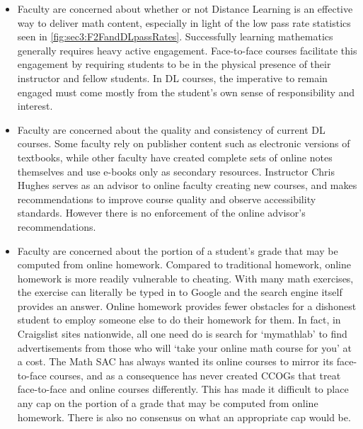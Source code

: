 \begin{itemize}
	\item Faculty are concerned about whether or not Distance Learning is an
	      effective way to deliver math content, especially in light of the low pass
	      rate statistics seen in \cref{fig:sec3:F2FandDLpassRates}.
	      Successfully learning mathematics generally requires heavy active engagement.
	      Face-to-face courses facilitate this engagement by requiring students to be in the physical presence of their instructor and fellow students.
	      In DL courses, the imperative to remain engaged must come mostly from the student's own sense of responsibility and interest.
	\item Faculty are concerned about the quality and consistency of current DL
	      courses.
	      Some faculty rely on publisher content such as electronic versions of textbooks, while other faculty have created complete sets of online notes themselves and use e-books only as secondary resources.
	      Instructor Chris Hughes serves as an advisor to online faculty creating new courses, and makes recommendations to improve course quality and observe accessibility standards.
	      However there is no enforcement of the online advisor's recommendations.
	\item Faculty are concerned about the portion of a student's grade that may be
	      computed from online homework.
	      Compared to traditional homework, online homework is more readily vulnerable to cheating.
	      With many math exercises, the exercise can literally be typed in to Google and the search engine itself provides an answer.
	      Online homework provides fewer obstacles for a dishonest student to employ someone else to do their homework for them.
	      In fact, in Craigslist sites nationwide, all one need do is search for `mymathlab' to find advertisements from those who will `take your online math course for you' at a cost.
	      The Math SAC has always wanted its online courses to mirror its face-to-face courses, and as a consequence has never created CCOGs that treat face-to-face and online courses differently.
	      This has made it difficult to place any cap on the portion of a grade that may be computed from online homework.
	      There is also no consensus on what an appropriate cap would be.
\end{itemize}

